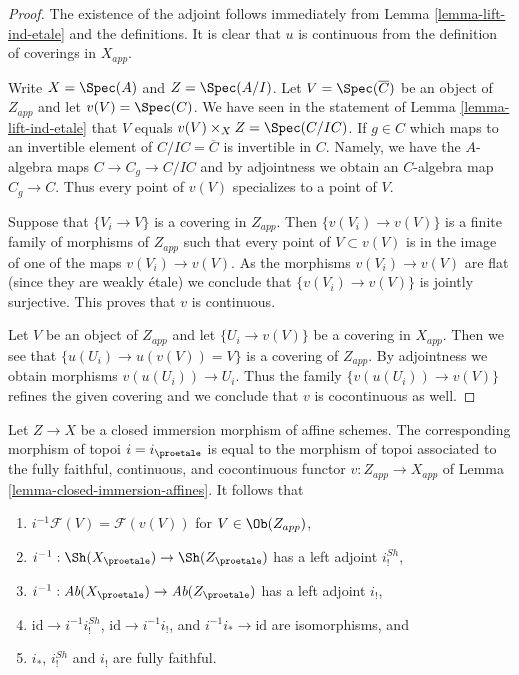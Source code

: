 \begin{proof}
The existence of the adjoint follows immediately from
Lemma \ref{lemma-lift-ind-etale} and the definitions.
It is clear that $u$ is continuous from the definition of
coverings in $X_{app}$.

\medskip\noindent
Write $X = \Spec(A)$ and $Z = \Spec(A/I)$. Let $V = \Spec(\overline{C})$
be an object of $Z_{app}$ and let $v(V) = \Spec(C)$.
We have seen in the statement of Lemma \ref{lemma-lift-ind-etale}
that $V$ equals $v(V) \times_X Z = \Spec(C/IC)$.
If $g \in C$ which maps to an invertible element of
$C/IC = \overline{C}$ is invertible in $C$. Namely, we have the
$A$-algebra maps $C \to C_g \to C/IC$ and by adjointness
we obtain an $C$-algebra map $C_g \to C$.
Thus every point of $v(V)$ specializes to a point of $V$.

\medskip\noindent
Suppose that $\{V_i \to V\}$ is a covering in $Z_{app}$.
Then $\{v(V_i) \to v(V)\}$ is a finite family of morphisms of
$Z_{app}$ such that every point of $V \subset v(V)$ is
in the image of one of the maps $v(V_i) \to v(V)$. As the
morphisms $v(V_i) \to v(V)$ are flat (since they are weakly \'etale)
we conclude that $\{v(V_i) \to v(V)\}$ is jointly surjective.
This proves that $v$ is continuous.

\medskip\noindent
Let $V$ be an object of $Z_{app}$ and let $\{U_i \to v(V)\}$
be a covering in $X_{app}$. Then we see that
$\{u(U_i) \to u(v(V)) = V\}$ is a covering of $Z_{app}$.
By adjointness we obtain morphisms $v(u(U_i)) \to U_i$.
Thus the family $\{v(u(U_i)) \to v(V)\}$ refines the given
covering and we conclude that $v$ is cocontinuous as well.
\end{proof}

\begin{lemma}
\label{lemma-closed-immersion-affines-apply}
Let $Z \to X$ be a closed immersion morphism of affine schemes.
The corresponding morphism of topoi $i = i_\proetale$
is equal to the morphism of topoi
associated to the fully faithful, continuous, and cocontinuous functor
$v : Z_{app} \to X_{app}$ of Lemma \ref{lemma-closed-immersion-affines}.
It follows that
\begin{enumerate}
\item $i^{-1}\mathcal{F}(V) = \mathcal{F}(v(V))$ for $V \in \Ob(Z_{app})$,
\item $i^{-1} : \Sh(X_\proetale) \to \Sh(Z_\proetale)$
has a left adjoint $i^{Sh}_!$,
\item
$i^{-1} : \textit{Ab}(X_\proetale) \to \textit{Ab}(Z_\proetale)$
has a left adjoint $i_!$,
\item $\text{id} \to i^{-1}i^{Sh}_!$, $\text{id} \to i^{-1}i_!$, and
$i^{-1}i_* \to \text{id}$ are isomorphisms, and
\item $i_*$, $i^{Sh}_!$ and $i_!$ are fully faithful.
\end{enumerate}
\end{lemma}

